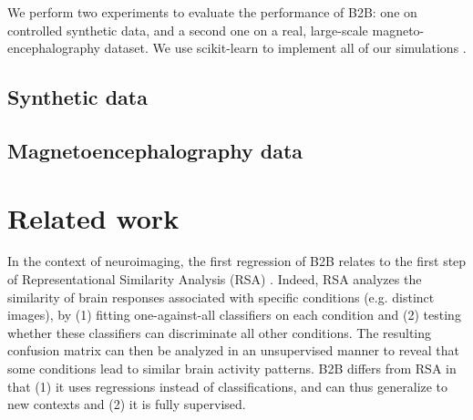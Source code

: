 \documentclass{article}
\begin{document}
We perform two experiments to evaluate the performance of B2B: one on controlled synthetic data, and a second one on a real, large-scale magneto-encephalography dataset.
%
We use scikit-learn to implement all of our simulations \citep{sklearn}.

\subsection{Synthetic data}
\label{sec:experiment_synthetic}



\subsection{Magnetoencephalography data}
\label{sec:experiment_real}



\section{Related work}

In the context of neuroimaging, the first regression of B2B relates to the first step of Representational Similarity Analysis (RSA) \citep{kriegeskorte2008representational}. Indeed, RSA analyzes the similarity of brain responses associated with specific conditions (e.g. distinct images), by (1) fitting one-against-all classifiers on each condition and (2) testing whether these classifiers can discriminate all other conditions. The resulting confusion matrix can then be analyzed in an unsupervised manner to reveal that some conditions lead to similar brain activity patterns. B2B differs from RSA in that (1) it uses regressions instead of classifications, and can thus generalize to new contexts and (2)
it is fully supervised.
\end{document}
